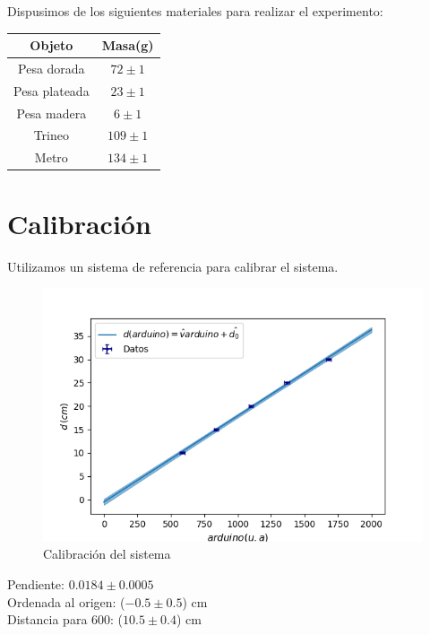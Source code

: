 \documentclass[12pt,a4]{article}
\begin{document}
Dispusimos de los siguientes materiales para realizar el experimento:

\begin{table}[H]
    \centering
    \begin{tabular}{|c|c|}
        \hline
        \textbf{Objeto} & \textbf{Masa(g)} \\
        \hline
        Pesa dorada & $72 \pm 1$ \\
        Pesa plateada & $23 \pm 1$ \\
        Pesa madera & $6 \pm 1$ \\
        Trineo & $109 \pm 1$ \\
        Metro & $134 \pm 1$ \\
        \hline
    \end{tabular}
    \label{tab:mediciones}
\end{table}

\newpage
\section{Calibración}

Utilizamos un sistema de referencia para calibrar el sistema.

\begin{figure}[H]
    \centering
    \includegraphics[width=0.9\linewidth]{Calibracion.png}
    \caption{Calibración del sistema}
    \label{fig:calibracion}
\end{figure}

Pendiente: $0.0184 \pm 0.0005$ \\

Ordenada al origen: ($-0.5 \pm 0.5$) cm\\

Distancia para 600: ($10.5 \pm 0.4$) cm \\
\end{document}
